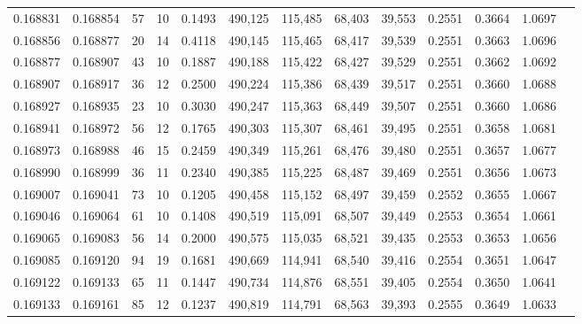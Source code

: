 \begin{tabular}{rrrrrrrrrrrrr}
0.168831 & 0.168854 &    57 &  10 &                                     0.1493 & 490,125 & 115,485 &  68,403 &  39,553 & 0.2551 & 0.3664 & 1.0697 \\
0.168856 & 0.168877 &    20 &  14 &                                     0.4118 & 490,145 & 115,465 &  68,417 &  39,539 & 0.2551 & 0.3663 & 1.0696 \\
0.168877 & 0.168907 &    43 &  10 &                                     0.1887 & 490,188 & 115,422 &  68,427 &  39,529 & 0.2551 & 0.3662 & 1.0692 \\
0.168907 & 0.168917 &    36 &  12 &                                     0.2500 & 490,224 & 115,386 &  68,439 &  39,517 & 0.2551 & 0.3660 & 1.0688 \\
0.168927 & 0.168935 &    23 &  10 &                                     0.3030 & 490,247 & 115,363 &  68,449 &  39,507 & 0.2551 & 0.3660 & 1.0686 \\
0.168941 & 0.168972 &    56 &  12 &                                     0.1765 & 490,303 & 115,307 &  68,461 &  39,495 & 0.2551 & 0.3658 & 1.0681 \\
0.168973 & 0.168988 &    46 &  15 &                                     0.2459 & 490,349 & 115,261 &  68,476 &  39,480 & 0.2551 & 0.3657 & 1.0677 \\
0.168990 & 0.168999 &    36 &  11 &                                     0.2340 & 490,385 & 115,225 &  68,487 &  39,469 & 0.2551 & 0.3656 & 1.0673 \\
0.169007 & 0.169041 &    73 &  10 &                                     0.1205 & 490,458 & 115,152 &  68,497 &  39,459 & 0.2552 & 0.3655 & 1.0667 \\
0.169046 & 0.169064 &    61 &  10 &                                     0.1408 & 490,519 & 115,091 &  68,507 &  39,449 & 0.2553 & 0.3654 & 1.0661 \\
0.169065 & 0.169083 &    56 &  14 &                                     0.2000 & 490,575 & 115,035 &  68,521 &  39,435 & 0.2553 & 0.3653 & 1.0656 \\
0.169085 & 0.169120 &    94 &  19 &                                     0.1681 & 490,669 & 114,941 &  68,540 &  39,416 & 0.2554 & 0.3651 & 1.0647 \\
0.169122 & 0.169133 &    65 &  11 &                                     0.1447 & 490,734 & 114,876 &  68,551 &  39,405 & 0.2554 & 0.3650 & 1.0641 \\
0.169133 & 0.169161 &    85 &  12 &                                     0.1237 & 490,819 & 114,791 &  68,563 &  39,393 & 0.2555 & 0.3649 & 1.0633 \\

\end{tabular}
